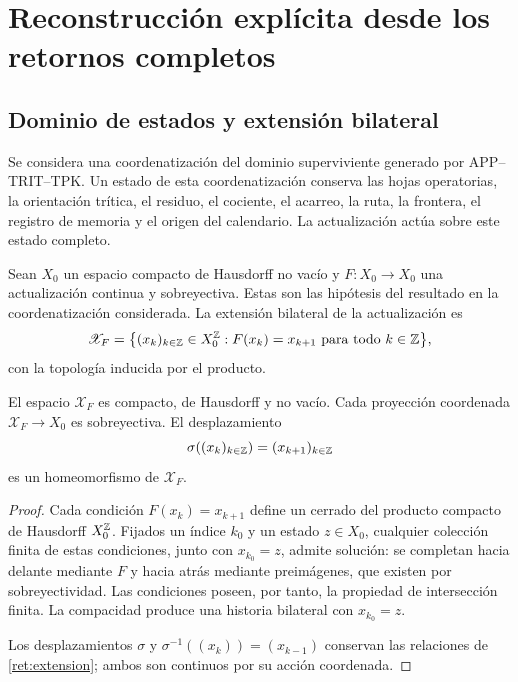 \section{Reconstrucción explícita desde los retornos completos}
\label{ret:seccion}

\subsection{Dominio de estados y extensión bilateral}

Se considera una coordenatización del dominio superviviente generado por
APP--TRIT--TPK. Un estado de esta coordenatización conserva las hojas operatorias,
la orientación trítica, el residuo, el cociente, el acarreo, la ruta,
la frontera, el registro de memoria y el origen del calendario.
La actualización actúa sobre este estado completo.

Sean \(X_0\) un espacio compacto de Hausdorff no vacío y
\(F:X_0\to X_0\) una actualización continua y sobreyectiva.
Estas son las hipótesis del resultado en la coordenatización considerada.
La extensión bilateral de la actualización es
\begin{equation}
 \mathscr X_F=
 \bigl\{(x_k)_{k\in\mathbb Z}\in X_0^{\mathbb Z}:
                  F(x_k)=x_{k+1}\text{ para todo }k\in\mathbb Z\bigr\},
 \label{ret:extension}
\end{equation}
con la topología inducida por el producto.

\begin{lemma}
\label{ret:existencia}
El espacio \(\mathscr X_F\) es compacto, de Hausdorff y no vacío.
Cada proyección coordenada \(\mathscr X_F\to X_0\) es sobreyectiva.
El desplazamiento
\[
 \sigma((x_k)_{k\in\mathbb Z})=(x_{k+1})_{k\in\mathbb Z}
\]
es un homeomorfismo de \(\mathscr X_F\).
\end{lemma}
\begin{proof}
Cada condición \(F(x_k)=x_{k+1}\) define un cerrado del producto
compacto de Hausdorff \(X_0^{\mathbb Z}\).
Fijados un índice \(k_0\) y un estado \(z\in X_0\), cualquier colección
finita de estas condiciones, junto con \(x_{k_0}=z\), admite solución:
se completan hacia delante mediante \(F\) y hacia atrás mediante
preimágenes, que existen por sobreyectividad. Las condiciones poseen,
por tanto, la propiedad de intersección finita. La compacidad produce
una historia bilateral con \(x_{k_0}=z\).

Los desplazamientos \(\sigma\) y
\(\sigma^{-1}((x_k))=(x_{k-1})\) conservan las relaciones de
\eqref{ret:extension}; ambos son continuos por su acción coordenada.
\end{proof}

